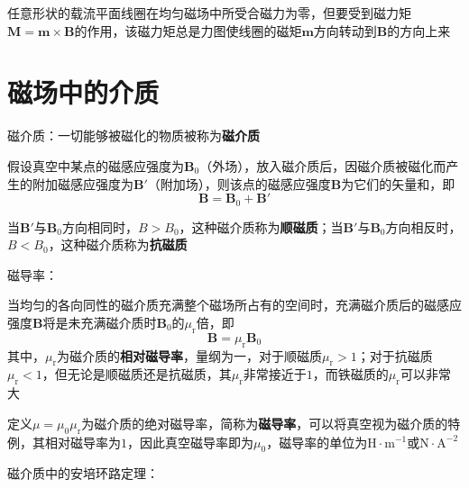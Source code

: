 \documentclass[12pt, a4paper, twoside]{ctexbook}
\begin{document}
任意形状的载流平面线圈在均匀磁场中所受合磁力为零，但要受到磁力矩$\boldsymbol{M}=\boldsymbol{m}\times\boldsymbol{B}$的作用，该磁力矩总是力图使线圈的磁矩$\boldsymbol{m}$方向转动到$\boldsymbol{B}$的方向上来

\section{磁场中的介质}
{\sonti 磁介质}：一切能够被磁化的物质被称为\textbf{磁介质}

假设真空中某点的磁感应强度为$\boldsymbol{B}_0$（外场），放入磁介质后，因磁介质被磁化而产生的附加磁感应强度为$\boldsymbol{B}'$（附加场），则该点的磁感应强度$\boldsymbol{B}$为它们的矢量和，即
$$
\boldsymbol{B}=\boldsymbol{B}_0+\boldsymbol{B}'
$$

当$\boldsymbol{B}'$与$\boldsymbol{B}_0$方向相同时，$B>B_0$，这种磁介质称为\textbf{顺磁质}；当$\boldsymbol{B}'$与$\boldsymbol{B}_0$方向相反时，$B<B_0$，这种磁介质称为\textbf{抗磁质}

{\sonti 磁导率}：

当均匀的各向同性的磁介质充满整个磁场所占有的空间时，充满磁介质后的磁感应强度$\boldsymbol{B}$将是未充满磁介质时$\boldsymbol{B}_0$的$\mu_\mathrm{r}$倍，即
$$
\boldsymbol{B}=\mu_\mathrm{r}\boldsymbol{B}_0
$$
其中，$\mu_\mathrm{r}$为磁介质的\textbf{相对磁导率}，量纲为一，对于顺磁质$\mu_\mathrm{r}>1$；对于抗磁质$\mu_\mathrm{r}<1$，但无论是顺磁质还是抗磁质，其$\mu_\mathrm{r}$非常接近于$1$，而铁磁质的$\mu_\mathrm{r}$可以非常大

定义$\mu=\mu_0\mu_\mathrm{r}$为磁介质的绝对磁导率，简称为\textbf{磁导率}，可以将真空视为磁介质的特例，其相对磁导率为$1$，因此真空磁导率即为$\mu_0$，磁导率的单位为$\mathrm{H}\cdot\mathrm{m}^{-1}$或$\mathrm{N}\cdot\mathrm{A}^{-2}$

{\sonti 磁介质中的安培环路定理}：
\end{document}

